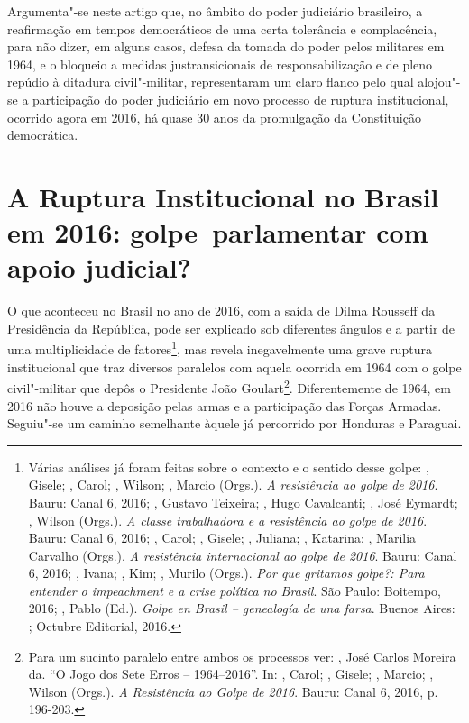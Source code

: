 Argumenta"-se neste artigo que, no âmbito do poder judiciário brasileiro,
a reafirmação em tempos democráticos de uma certa tolerância e
complacência, para não dizer, em alguns casos, defesa da tomada do poder
pelos militares em 1964, e o bloqueio a medidas justransicionais de
responsabilização e de pleno repúdio à ditadura civil"-militar,
representaram um claro flanco pelo qual alojou"-se a participação do
poder judiciário em novo processo de ruptura institucional, ocorrido
agora em 2016, há quase 30 anos da promulgação da Constituição
democrática.

\section{A Ruptura Institucional no Brasil em 2016: golpe~parlamentar
com apoio judicial?}

O que aconteceu no Brasil no ano de 2016, com a saída de Dilma Rousseff
da Presidência da República, pode ser explicado sob diferentes ângulos e
a partir de uma multiplicidade de fatores\footnote{Várias análises já
  foram feitas sobre o contexto e o sentido desse golpe: ,
  Gisele; , Carol;  , Wilson; , Marcio (Orgs.).
  \emph{A resistência ao golpe de 2016}. Bauru: Canal 6, 2016; ,
  Gustavo Teixeira;  , Hugo Cavalcanti;
  , José Eymardt; 
  , Wilson (Orgs.). \emph{A classe trabalhadora e
  a resistência ao golpe de 2016}. Bauru: Canal 6, 2016; , Carol;
  , Gisele; ,
  Juliana; , Katarina;
  , Marilia Carvalho (Orgs.). \emph{A resistência
  internacional ao golpe de 2016}. Bauru: Canal 6, 2016; ,
  Ivana; , Kim; , Murilo (Orgs.). \emph{Por que gritamos
  golpe?: Para entender o impeachment e a crise política no Brasil}. São
  Paulo: Boitempo, 2016; , Pablo (Ed.). \emph{Golpe en Brasil
  -- genealogía de una farsa}. Buenos Aires: ; Octubre Editorial,
  2016.}, mas revela inegavelmente uma grave ruptura institucional que
traz diversos paralelos com aquela ocorrida em 1964 com o golpe
civil"-militar que depôs o Presidente João Goulart\footnote{Para um
  sucinto paralelo entre ambos os processos ver: , José
  Carlos Moreira da. ``O Jogo dos Sete Erros -- 1964--2016''. In: ,
  Carol; , Gisele; , Marcio;  , Wilson
  (Orgs.). \emph{A Resistência ao Golpe de 2016}. Bauru: Canal 6,
  2016, p. 196-203.}. Diferentemente de 1964, em 2016 não houve a
deposição pelas armas e a participação das Forças Armadas. Seguiu"-se um
caminho semelhante àquele já percorrido por Honduras e Paraguai.


